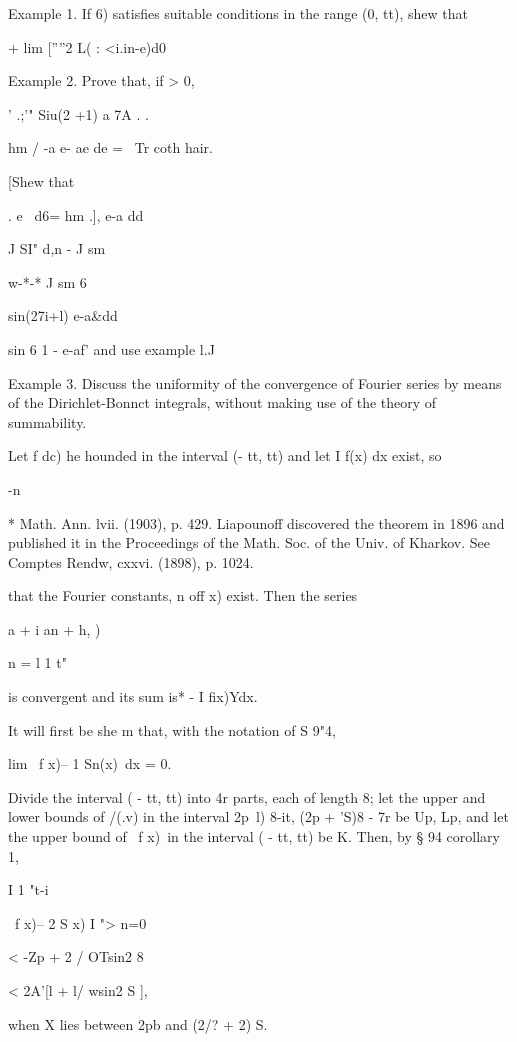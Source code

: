 Example 1. If 6) satisfies suitable conditions in the range (0, tt),
shew that

+ lim [''''2 L( : <i.in-e)d0

Example 2. Prove that, if > 0,

' .;'" Siu(2 +1) a 7A . .

hm / -a e- ae de = \ Tr coth hair.

 [Shew that

  . e~ d6= hm .], e-a dd

J SI" d,n - J sm

w-*-* J sm 6

  sin(27i+l) e-a\&dd

sin 6 1 - e-af' and use example l.J

Example 3. Discuss the uniformity of the convergence of Fourier series
by means of the Dirichlet-Bonnct integrals, without making use of the
theory of summability.

Let f dc) he hounded in the interval (- tt, tt) and let I f(x) dx
exist, so

 -n

* Math. Ann. lvii. (1903), p. 429. Liapounoff discovered the theorem
in 1896 and published it in the Proceedings of the Math. Soc. of the
Univ. of Kharkov. See Comptes Rendw, cxxvi. (1898), p. 1024.

%
%

that the Fourier constants, n off x) exist. Then the series

 a + i an + h, )

n = l 1 t"

is convergent and its sum is* - I fix)Ydx.

It will first be she m that, with the notation of S 9"4,

lim \ f x)-- 1 Sn(x)\ dx = 0.

Divide the interval ( - tt, tt) into 4r parts, each of length 8; let
the upper and lower bounds of /(.v) in the interval 2p~l) 8-it, (2p +
'S)8 - 7r be Up, Lp, and let the upper bound of \ f x)\ in the
interval ( - tt, tt) be K. Then, by § 94 corollary 1,

I 1 "t-i

\ f x)-- 2 S x) I "> n=0

< -Zp + 2 / OTsin2 8

< 2A'[l + l/ wsin2 S ],

when X lies between 2pb and (2/? + 2) S.

